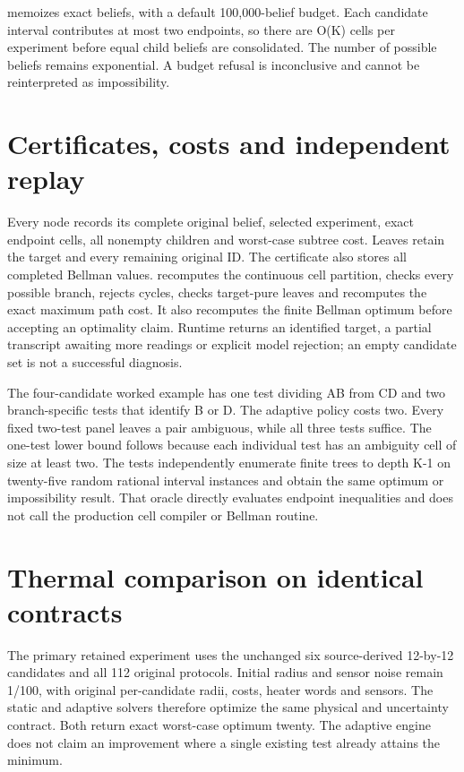 \documentclass[
  11pt,
  a4paper,
]{report}
\let\singularitytexttt\texttt
\renewcommand{\texttt}[1]{\singularitytexttt{\seqsplit{#1}}}
\begin{document}
\texttt{minimum\_reset\_policy} memoizes exact beliefs, with a default
100,000-belief budget. Each candidate interval contributes at most two
endpoints, so there are O(K) cells per experiment before equal child
beliefs are consolidated. The number of possible beliefs remains
exponential. A budget refusal is inconclusive and cannot be
reinterpreted as impossibility.

\hypertarget{certificates-costs-and-independent-replay}{%
\section{Certificates, costs and independent
replay}\label{certificates-costs-and-independent-replay}}

Every node records its complete original belief, selected experiment,
exact endpoint cells, all nonempty children and worst-case subtree cost.
Leaves retain the target and every remaining original ID. The
certificate also stores all completed Bellman values.
\texttt{verify\_reset\_policy} recomputes the continuous cell partition,
checks every possible branch, rejects cycles, checks target-pure leaves
and recomputes the exact maximum path cost. It also recomputes the
finite Bellman optimum before accepting an optimality claim. Runtime
\texttt{replay\_policy} returns an identified target, a partial
transcript awaiting more readings or explicit model rejection; an empty
candidate set is not a successful diagnosis.

The four-candidate worked example has one test dividing AB from CD and
two branch-specific tests that identify B or D. The adaptive policy
costs two. Every fixed two-test panel leaves a pair ambiguous, while all
three tests suffice. The one-test lower bound follows because each
individual test has an ambiguity cell of size at least two. The tests
independently enumerate finite trees to depth K-1 on twenty-five random
rational interval instances and obtain the same optimum or impossibility
result. That oracle directly evaluates endpoint inequalities and does
not call the production cell compiler or Bellman routine.

\hypertarget{thermal-comparison-on-identical-contracts}{%
\section{Thermal comparison on identical
contracts}\label{thermal-comparison-on-identical-contracts}}

The primary retained experiment uses the unchanged six source-derived
12-by-12 candidates and all 112 original protocols. Initial radius and
sensor noise remain 1/100, with original per-candidate radii, costs,
heater words and sensors. The static and adaptive solvers therefore
optimize the same physical and uncertainty contract. Both return exact
worst-case optimum twenty. The adaptive engine does not claim an
improvement where a single existing test already attains the minimum.
\end{document}
